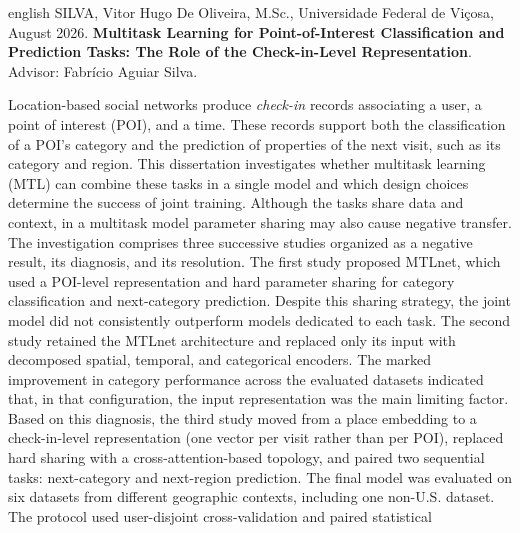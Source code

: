    \begin{resumo}[Abstract]
        \begin{otherlanguage*}{english}
            \singlespacing
            SILVA, Vitor Hugo De Oliveira, M.Sc., Universidade Federal de Viçosa, August 2026.
            \textbf{Multitask Learning for Point-of-Interest Classification and Prediction Tasks: The Role of the Check-in-Level Representation}. Advisor: Fabrício Aguiar Silva.
            \vspace{\onelineskip}

            \noindent Location-based social networks produce \emph{check-in} records
            associating a user, a point of interest (POI), and a time. These records
            support both the classification of a POI's category and the prediction of
            properties of the next visit, such as its category and region. This
            dissertation investigates whether multitask learning (MTL) can combine
            these tasks in a single model and which design choices determine the
            success of joint training. Although the tasks share data and context,
            in a multitask model parameter sharing may also cause negative
            transfer. The investigation
            comprises three successive studies organized as a negative result, its
            diagnosis, and its resolution. The first study proposed MTLnet, which used
            a POI-level representation and hard parameter sharing for category
            classification and next-category prediction. Despite this sharing
            strategy, the joint model did not consistently outperform models dedicated
            to each task. The second study
            retained the MTLnet architecture and replaced only its input with
            decomposed spatial, temporal, and categorical encoders. The marked
            improvement in category performance across the evaluated datasets
            indicated that, in that configuration, the input representation was the
            main limiting factor. Based on this diagnosis, the third study moved
            from a place embedding to a check-in-level representation (one vector
            per visit rather than per POI), replaced hard sharing with a
            cross-attention-based topology, and paired two sequential tasks:
            next-category and next-region prediction. The final model was evaluated on
            six datasets from different geographic contexts, including one non-U.S.
            dataset.
            The protocol used user-disjoint cross-validation and paired statistical

\end{otherlanguage*}
\end{resumo}
